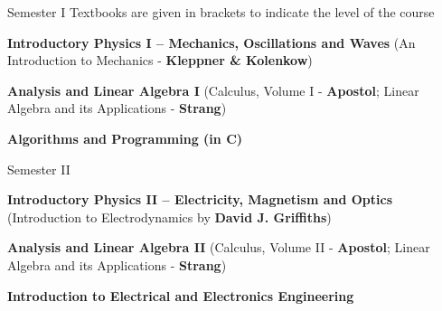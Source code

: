 

\begin{cventries}

  \cventry
    {Semester I} %
    {Textbooks are given in brackets to indicate the level of the course} %
    {} %
    {} %
    {
      \begin{cvitems} %
        \item {\textbf{Introductory Physics I – Mechanics, Oscillations and Waves} (An Introduction to Mechanics - \textbf{Kleppner \& Kolenkow})}
        \item {\textbf{Analysis and Linear Algebra I} (Calculus, Volume I - \textbf{Apostol}; Linear Algebra and its Applications - \textbf{Strang})}
        \item {\textbf{Algorithms and Programming (in C)}}
      \end{cvitems}
    }

  \cventry
    {Semester II} %
    {} %
    {} %
    {} %
    {
      \begin{cvitems} %
        \item {\textbf{Introductory Physics II – Electricity, Magnetism and Optics} (Introduction to Electrodynamics by \textbf{David J. Griffiths})}
        \item {\textbf{Analysis and Linear Algebra II} (Calculus, Volume II - \textbf{Apostol}; Linear Algebra and its Applications - \textbf{Strang})}
        \item{\textbf{Introduction to Electrical and Electronics Engineering}}
      \end{cvitems}
    }


\end{cventries}
